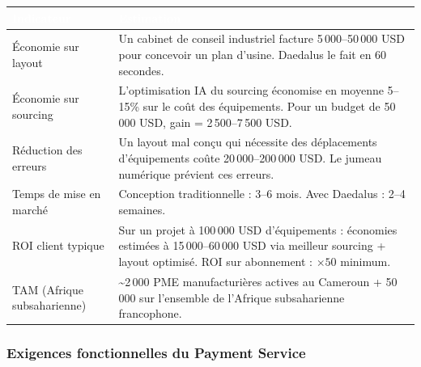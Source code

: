 \documentclass[12pt,a4paper]{article}
\begin{document}
\begin{tabularx}{\textwidth}{|l|X|}
\hline
\rowcolor{tablehead}\textcolor{white}{\textbf{Indicateur}} & \textcolor{white}{\textbf{Estimation}} \\
\hline
Économie sur layout & Un cabinet de conseil industriel facture 5\,000--50\,000 USD pour concevoir un plan d'usine. Daedalus le fait en 60 secondes. \\
\hline
Économie sur sourcing & L'optimisation IA du sourcing économise en moyenne 5--15\% sur le coût des équipements. Pour un budget de 50\,000 USD, gain = 2\,500--7\,500 USD. \\
\hline
Réduction des erreurs & Un layout mal conçu qui nécessite des déplacements d'équipements coûte 20\,000--200\,000 USD. Le jumeau numérique prévient ces erreurs. \\
\hline
Temps de mise en marché & Conception traditionnelle : 3--6 mois. Avec Daedalus : 2--4 semaines. \\
\hline
ROI client typique & Sur un projet à 100\,000 USD d'équipements : économies estimées à 15\,000--60\,000 USD via meilleur sourcing + layout optimisé. ROI sur abonnement : $\times 50$ minimum. \\
\hline
TAM (Afrique subsaharienne) & \textasciitilde 2\,000 PME manufacturières actives au Cameroun + 50\,000 sur l'ensemble de l'Afrique subsaharienne francophone. \\
\hline
\end{tabularx}

\subsubsection{Exigences fonctionnelles du Payment Service}
\end{document}

